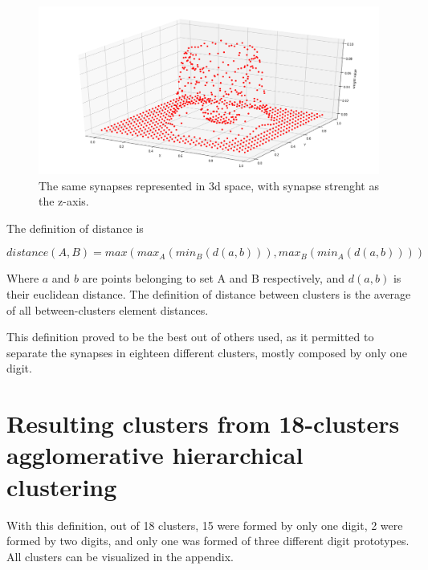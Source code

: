 \documentclass[a4paper]{report}
\begin{document}
\begin{figure} [H]
    \centering
    \includegraphics [width=12cm ] {o/zero_three.png}
    \caption{The same synapses represented in 3d space, with synapse strenght as the z-axis.}
    \label{zero_three}
\end{figure}

The definition of distance is

\begin{equation}
    distance(A, B) = max(max_A(min_B(d(a,b))), max_B(min_A(d(a,b))))
\end{equation}

Where $a$ and $b$ are points belonging to set A and B respectively, and $d(a,b)$ is their euclidean distance. The definition of distance between clusters is the average of all between-clusters element distances.

This definition proved to be the best out of others used, as it permitted to separate the synapses in eighteen different clusters, mostly composed by only one digit.



\section{Resulting clusters from 18-clusters agglomerative hierarchical clustering}

With this definition, out of 18 clusters, 15 were formed by only one digit, 2 were formed by two digits, and only one was formed of three different digit prototypes. All clusters can be visualized in the appendix.
\end{document}
